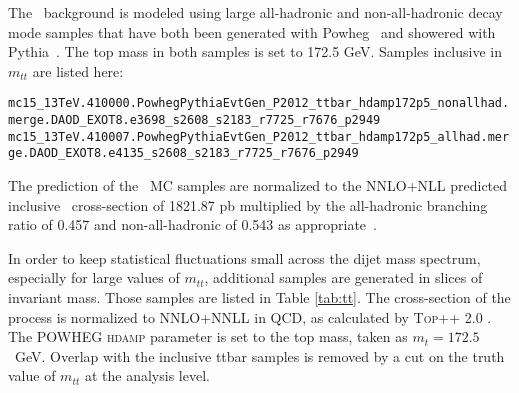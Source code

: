 

The \ttbar\ background is modeled using large all-hadronic and non-all-hadronic decay mode samples that have both been generated with Powheg~\cite{powheg} and showered with Pythia~\cite{pythia8}. The top mass in both samples is set to 172.5 GeV. Samples inclusive in $m_{tt}$ are listed here:

\noindent
{\scriptsize
\verb|mc15_13TeV.410000.PowhegPythiaEvtGen_P2012_ttbar_hdamp172p5_nonallhad.merge.DAOD_EXOT8.e3698_s2608_s2183_r7725_r7676_p2949|\\
\verb|mc15_13TeV.410007.PowhegPythiaEvtGen_P2012_ttbar_hdamp172p5_allhad.merge.DAOD_EXOT8.e4135_s2608_s2183_r7725_r7676_p2949|
}

The prediction of the \ttbar\ MC samples are normalized to the NNLO+NLL predicted inclusive \ttbar\ cross-section of
1821.87 pb multiplied by the all-hadronic branching ratio of 0.457 and non-all-hadronic of 0.543 as appropriate~\cite{TTbarXSec}. 

In order to keep statistical fluctuations small across the dijet mass spectrum, especially for large values of $m_{tt}$, additional \ttbar samples are generated in slices of \ttbar invariant mass. Those samples are listed in Table \ref{tab:tt}. The cross-section of the \ttbar process is normalized to NNLO+NNLL in QCD, as calculated by \textsc{Top++} 2.0 \cite{Czakon:2011xx}. The POWHEG \textsc{hdamp} parameter \cite{ATL-PHYS-PUB-2014-005} is set to the top mass, taken as $m_{t} = 172.5$~GeV. Overlap with the inclusive ttbar samples is removed by a cut on the truth value of $m_{tt}$ at the analysis level.
 
